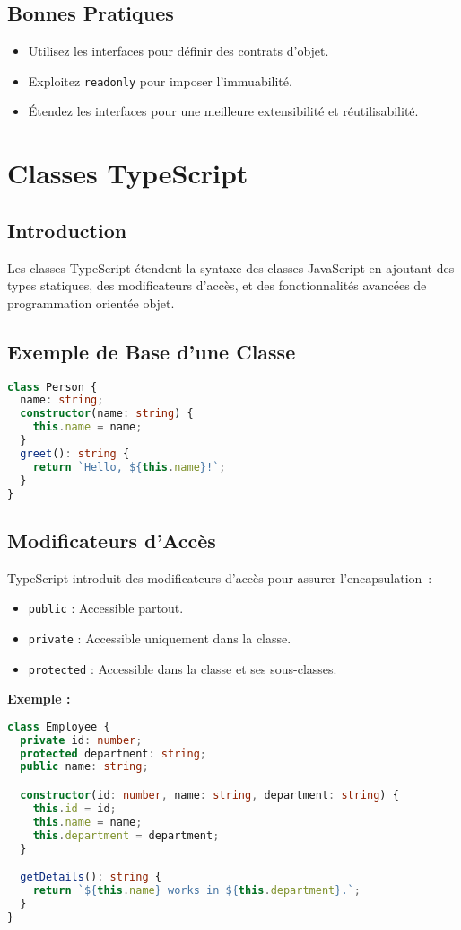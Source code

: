 \documentclass[a4paper,12pt]{article}
\begin{document}
\subsection*{Bonnes Pratiques}
\begin{itemize}
    \item Utilisez les interfaces pour définir des contrats d’objet.
    \item Exploitez \texttt{readonly} pour imposer l’immuabilité.
    \item Étendez les interfaces pour une meilleure extensibilité et réutilisabilité.
\end{itemize}

\section{Classes TypeScript}
\subsection*{Introduction}
Les classes TypeScript étendent la syntaxe des classes JavaScript en ajoutant des types statiques, des modificateurs d’accès, et des fonctionnalités avancées de programmation orientée objet.

\subsection*{Exemple de Base d’une Classe}
\begin{lstlisting}[language=TypeScript]
class Person {
  name: string;
  constructor(name: string) {
    this.name = name;
  }
  greet(): string {
    return `Hello, ${this.name}!`;
  }
}
\end{lstlisting}

\subsection*{Modificateurs d’Accès}
TypeScript introduit des modificateurs d’accès pour assurer l’encapsulation :
\begin{itemize}
    \item \texttt{public} : Accessible partout.
    \item \texttt{private} : Accessible uniquement dans la classe.
    \item \texttt{protected} : Accessible dans la classe et ses sous-classes.
\end{itemize}

\textbf{Exemple :}
\begin{lstlisting}[language=TypeScript]
class Employee {
  private id: number;
  protected department: string;
  public name: string;

  constructor(id: number, name: string, department: string) {
    this.id = id;
    this.name = name;
    this.department = department;
  }

  getDetails(): string {
    return `${this.name} works in ${this.department}.`;
  }
}
\end{lstlisting}
\end{document}

